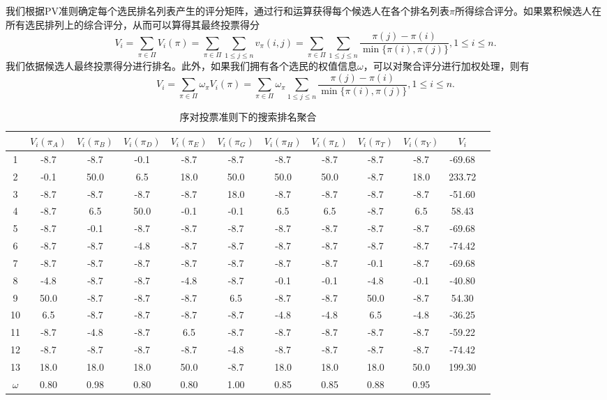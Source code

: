 我们根据PV准则确定每个选民排名列表产生的评分矩阵，通过行和运算获得每个候选人在各个排名列表$\pi$所得综合评分。如果累积候选人在所有选民排列上的综合评分，从而可以算得其最终投票得分
\begin{equation}\label{eq:pvagg}
    V_i = \sum\limits_{\pi\in\Pi} V_i(\pi) = \sum\limits_{\pi\in\Pi} \sum\limits_{1\le j\le n} v_\pi(i,j) = \sum\limits_{\pi\in\Pi} \sum\limits_{1\le j\le n} \frac{\pi(j)-\pi(i)}{\min\{\pi(i),\pi(j)\}}, 1\le i \le n.
\end{equation}
我们依据候选人最终投票得分进行排名。此外，如果我们拥有各个选民的权值信息$\omega$，可以对聚合评分进行加权处理，则有
\begin{equation}\label{eq:wpvagg}
    V_i = \sum\limits_{\pi\in\Pi} \omega_\pi V_i(\pi) = \sum\limits_{\pi\in\Pi} \omega_\pi \sum\limits_{1\le j\le n} \frac{\pi(j)-\pi(i)}{\min\{\pi(i),\pi(j)\}}, 1\le i \le n.
\end{equation}
\begin{table}[htbp]
\centering
\begin{tabular}{|c|c|c|c|c|c|c|c|c|c|c|c|}
\hline
& $V_i(\pi_A)$ & $V_i(\pi_B)$ & $V_i(\pi_D)$ & $V_i(\pi_E)$ & $V_i(\pi_G)$ & $V_i(\pi_H)$ & $V_i(\pi_L)$ & $V_i(\pi_T)$ & $V_i(\pi_Y)$ & $V_i$\\
\hline
1 & -8.7 & -8.7 & -0.1 & -8.7 & -8.7 & -8.7 & -8.7 & -8.7 & -8.7 & -69.68\\
\hline
2 & -0.1 & 50.0 & 6.5 & 18.0 & 50.0 & 50.0 & 50.0 & -8.7 & 18.0 & 233.72\\
\hline
3 & -8.7 & -8.7 & -8.7 & -8.7 & 18.0 & -8.7 & -8.7 & -8.7 & -8.7 & -51.60\\
\hline
4 & -8.7 & 6.5 & 50.0 & -0.1 & -0.1 & 6.5 & 6.5 & -8.7 & 6.5 & 58.43\\
\hline
5 & -8.7 & -0.1 & -8.7 & -8.7 & -8.7 & -8.7 & -8.7 & -8.7 & -8.7 & -69.68\\
\hline
6 & -8.7 & -8.7 & -4.8 & -8.7 & -8.7 & -8.7 & -8.7 & -8.7 & -8.7 & -74.42\\
\hline
7 & -8.7 & -8.7 & -8.7 & -8.7 & -8.7 & -8.7 & -8.7 & -0.1 & -8.7 & -69.68\\
\hline
8 & -4.8 & -8.7 & -8.7 & -4.8 & -8.7 & -0.1 & -0.1 & -4.8 & -0.1 & -40.80\\
\hline
9 & 50.0 & -8.7 & -8.7 & -8.7 & 6.5 & -8.7 & -8.7 & 50.0 & -8.7 & 54.30\\
\hline
10 & 6.5 & -8.7 & -8.7 & -8.7 & -8.7 & -4.8 & -4.8 & 6.5 & -4.8 & -36.25\\
\hline
11 & -8.7 & -4.8 & -8.7 & 6.5 & -8.7 & -8.7 & -8.7 & -8.7 & -8.7 & -59.22\\
\hline
12 & -8.7 & -8.7 & -8.7 & -8.7 & -4.8 & -8.7 & -8.7 & -8.7 & -8.7 & -74.42\\
\hline
13 & 18.0 & 18.0 & 18.0 & 50.0 & -8.7 & 18.0 & 18.0 & 18.0 & 50.0 & 199.30\\
\hline
$\omega$ & 0.80 & 0.98 & 0.80 & 0.80 & 1.00 & 0.85 & 0.85 & 0.88 & 0.95 &\\
\hline
\end{tabular}
\caption{序对投票准则下的搜索排名聚合}
\label{tbl:metasearch-pv}
\end{table}
